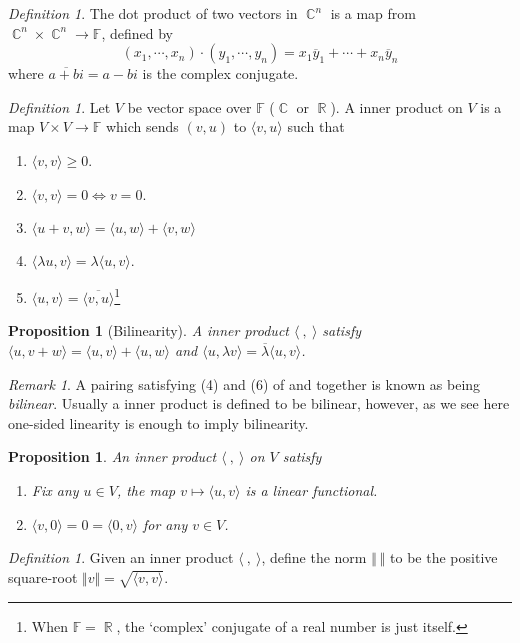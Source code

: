 \documentclass[12pt]{amsart}
\newcommand{\fff}[0]{\mathbb{F}}
\renewcommand{\geq}{\geqslant}
\DeclareMathOperator{\rr}{\mathbb{R}}
\DeclareMathOperator{\cc}{\mathbb{C}}
\newtheorem{proposition}[theorem]{Proposition}
\theoremstyle{remark}
\newtheorem{remark}[theorem]{Remark}
\newtheorem{definition}[theorem]{Definition}
\numberwithin{equation}{section}
\begin{document}
	
	\begin{definition}
		The dot product of two vectors in $\cc^n$ is a map from $\cc^n\times \cc^n\to \fff$, defined by
		\[(x_1,\cdots,x_n)\cdot (y_1,\cdots,y_n)=x_1\overline y_1+\cdots+x_n\overline y_n\]
		where $\overline{a+bi}=a-bi$ is the complex conjugate.
	\end{definition}
	\begin{definition}\label{def:inner_product}Let $V$ be vector space over $\fff$ ($\cc$ or $\rr$).
		A inner product on $V$ is a map $V\times V\to \fff$ which sends $(v,u)$ to $\langle v,u\rangle$ such that
		\begin{enumerate}
			\item $\langle v,v\rangle\geq 0$.
			\item $\langle v,v\rangle=0\iff v=0$.
			\item $\langle u+v,w\rangle=\langle u,w\rangle+\langle v,w\rangle$
			\item $\langle \lambda u,v\rangle=\lambda \langle u,v\rangle$.
			\item $\langle u,v\rangle=\overline{\langle v,u\rangle }$\footnote{When $\fff=\rr$, the `complex' conjugate of a real number is just itself.}
		\end{enumerate}
	\end{definition}
	\begin{proposition}[Bilinearity]\label{prop:bilinear} A inner product $\langle\ ,\ \rangle$ satisfy $\langle u,v+w\rangle = \langle u,v\rangle + \langle u,w\rangle$ and $\langle u,\lambda v\rangle =\overline{\lambda}\langle u,v\rangle$.
	\end{proposition}
	\begin{remark}
		A pairing satisfying (4) and (6) of  and  together is known as being \emph{bilinear}. Usually a inner product is defined to be bilinear, however, as we see here one-sided linearity is enough to imply bilinearity.
	\end{remark}
	\begin{proposition}
		An inner product $\langle\ , \ \rangle$ on $V$ satisfy
		\begin{enumerate}
			\item Fix any $u\in V$, the map $v\mapsto \langle u,v\rangle$ is a linear functional.
			\item $\langle v,0\rangle =0= \langle 0,v\rangle $ for any $v\in V$.
		\end{enumerate}
	\end{proposition}
	\begin{definition}
		Given an inner product $\langle \ ,\ \rangle$, define the norm $\Vert\ \Vert$ to be the positive square-root $\Vert v\Vert=\sqrt{\langle v,v\rangle}$.
	\end{definition}
	
\end{document}
